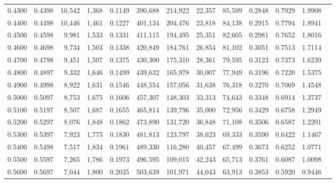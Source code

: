 \begin{tabular}{rrrrrrrrrrrrr}
0.4300 & 0.4398 & 10,542 & 1,368 &                                     0.1149 & 390,688 & 214,922 &  22,357 &  85,599 & 0.2848 & 0.7929 & 1.9908 \\
0.4400 & 0.4498 & 10,446 & 1,461 &                                     0.1227 & 401,134 & 204,476 &  23,818 &  84,138 & 0.2915 & 0.7794 & 1.8941 \\
0.4500 & 0.4598 &  9,981 & 1,533 &                                     0.1331 & 411,115 & 194,495 &  25,351 &  82,605 & 0.2981 & 0.7652 & 1.8016 \\
0.4600 & 0.4698 &  9,734 & 1,503 &                                     0.1338 & 420,849 & 184,761 &  26,854 &  81,102 & 0.3051 & 0.7513 & 1.7114 \\
0.4700 & 0.4798 &  9,451 & 1,507 &                                     0.1375 & 430,300 & 175,310 &  28,361 &  79,595 & 0.3123 & 0.7373 & 1.6239 \\
0.4800 & 0.4897 &  9,332 & 1,646 &                                     0.1499 & 439,632 & 165,978 &  30,007 &  77,949 & 0.3196 & 0.7220 & 1.5375 \\
0.4900 & 0.4998 &  8,922 & 1,631 &                                     0.1546 & 448,554 & 157,056 &  31,638 &  76,318 & 0.3270 & 0.7069 & 1.4548 \\
0.5000 & 0.5097 &  8,753 & 1,675 &                                     0.1606 & 457,307 & 148,303 &  33,313 &  74,643 & 0.3348 & 0.6914 & 1.3737 \\
0.5100 & 0.5197 &  8,507 & 1,687 &                                     0.1655 & 465,814 & 139,796 &  35,000 &  72,956 & 0.3429 & 0.6758 & 1.2949 \\
0.5200 & 0.5297 &  8,076 & 1,848 &                                     0.1862 & 473,890 & 131,720 &  36,848 &  71,108 & 0.3506 & 0.6587 & 1.2201 \\
0.5300 & 0.5397 &  7,923 & 1,775 &                                     0.1830 & 481,813 & 123,797 &  38,623 &  69,333 & 0.3590 & 0.6422 & 1.1467 \\
0.5400 & 0.5498 &  7,517 & 1,834 &                                     0.1961 & 489,330 & 116,280 &  40,457 &  67,499 & 0.3673 & 0.6252 & 1.0771 \\
0.5500 & 0.5597 &  7,265 & 1,786 &                                     0.1973 & 496,595 & 109,015 &  42,243 &  65,713 & 0.3761 & 0.6087 & 1.0098 \\
0.5600 & 0.5697 &  7,044 & 1,800 &                                     0.2035 & 503,639 & 101,971 &  44,043 &  63,913 & 0.3853 & 0.5920 & 0.9446 \\

\end{tabular}
